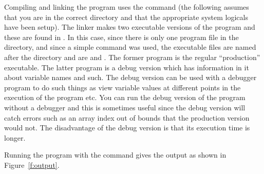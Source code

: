 Compiling and linking the program uses the  command (the
following assumes that you are in the correct directory and that the
appropriate system logicals have been setup). The linker makes two
executable versions of the program and these are found in .
In this case, since there is only one program file in the directory, and
since a simple  command was used, the executable files are
named after the directory and are  and
. The former program is the regular 
``production'' executable. The latter program is a debug version
which has information in it about variable names and such. The debug version
can be used with a debugger program to do such things as
view variable values at different
points in the execution of the program etc. You can run the debug version
of the program without a debugger and this is sometimes useful since
the debug version will catch errors such as an array index out of bounds that
the production version would not. The disadvantage of the debug version is
that its execution time is longer.

Running the program with the command 
gives the output as shown in Figure~\ref{f:output}.

